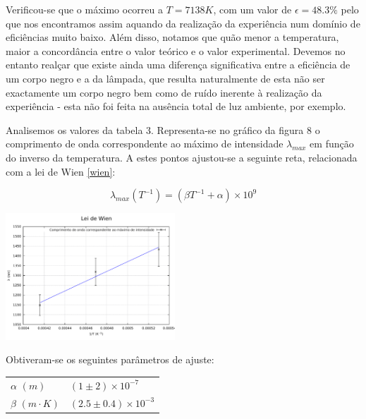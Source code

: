 \documentclass[9pt]{extarticle}
\newcommand{\PC}[1]{\ensuremath{\left(#1\right)}}
\begin{document}
\begin{multicols}{2}
\par Verificou-se que o máximo ocorreu a $T=7138K$, com um valor de $\epsilon=48.3\%$ pelo que nos encontramos assim aquando da realização da experiência num domínio de eficiências muito baixo. Além disso, notamos que quão menor a temperatura, maior a concordância entre o valor teórico e o valor experimental. Devemos no entanto realçar que existe ainda uma diferença significativa entre a eficiência de um corpo negro e a da lâmpada, que resulta naturalmente de esta não ser exactamente um corpo negro bem como de ruído inerente à realização da experiência - esta não foi feita na ausência total de luz ambiente, por exemplo.

\par Analisemos os valores da tabela 3. Representa-se no gráfico da figura 8 o comprimento de onda correspondente ao máximo de intensidade $\lambda_{max}$ em função do inverso da temperatura. A estes pontos ajustou-se a seguinte reta, relacionada com a lei de Wien \eqref{wien}:

\begin{equation} \label{wienP}
\lambda_{max}\PC{T^{-1}}=\PC{\beta T^{-1}+\alpha}\times10^{9}
\end{equation}

\begin{center}
\includegraphics[width=180pt]{wien.pdf}
\par{}
\end{center}

\par Obtiveram-se os seguintes parâmetros de ajuste:

{\small
\begin{center}
\begin{tabular}{ x{1.5cm} x{2.4cm} }
\hline \hline
$\alpha$ $(m)$ & $\PC{1\pm2}\times10^{-7}$ \tabularnewline
$\beta$ $(m\cdot K)$ & $\PC{2.5\pm0.4}\times10^{-3}$ \tabularnewline
\hline \hline
\end{tabular}
\end{center}
}


\end{multicols}
\end{document}
